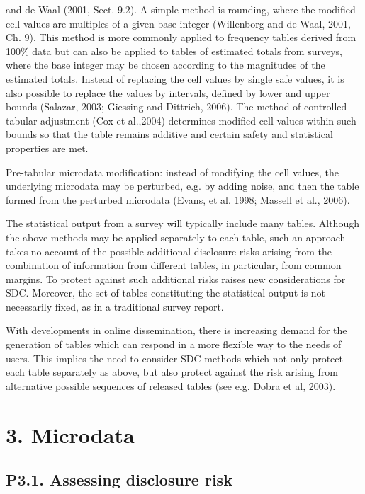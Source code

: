 


and de Waal (2001, Sect. 9.2). A simple method is rounding, where the modified cell
values are multiples of a given base integer (Willenborg and de Waal, 2001, Ch. 9). This
method is more commonly applied to frequency tables derived from 100\% data but can
also be applied to tables of estimated totals from surveys, where the base integer may be
chosen according to the magnitudes of the estimated totals. Instead of replacing the cell
values by single safe values, it is also possible to replace the values by intervals, defined
by lower and upper bounds (Salazar, 2003; Giessing and Dittrich, 2006). The method of
controlled tabular adjustment (Cox et al.,2004) determines modified cell values within
such bounds so that the table remains additive and certain safety and statistical properties
are met.

Pre-tabular microdata modification: instead of modifying the cell values, the
underlying microdata may be perturbed, e.g. by adding noise, and then the table formed
from the perturbed microdata (Evans, et al. 1998; Massell et al., 2006).

The statistical output from a survey will typically include many tables. Although the
above methods may be applied separately to each table, such an approach takes no
account of the possible additional disclosure risks arising from the combination of
information from different tables, in particular, from common margins. To protect against
such additional risks raises new considerations for SDC. Moreover, the set of tables
constituting the statistical output is not necessarily fixed, as in a traditional survey report.

With developments in online dissemination, there is increasing demand for the generation
of tables which can respond in a more flexible way to the needs of users. This implies the
need to consider SDC methods which not only protect each table separately as above, but
also protect against the risk arising from alternative possible sequences of released tables
(see e.g. Dobra et al, 2003).

\newpage
\section*{3. Microdata}

\subsection*{P3.1. Assessing disclosure risk}

